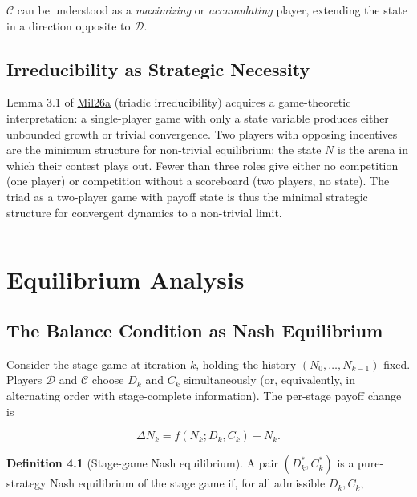 \documentclass[12pt]{article}
\begin{document}
\(\mathcal{C}\) can be understood as a \emph{maximizing} or
\emph{accumulating} player, extending the state in a direction opposite
to \(\mathcal{D}\).

\subsection{Irreducibility as Strategic Necessity}\label{irreducibility-as-strategic-necessity}

Lemma 3.1 of
\href{https://github.com/baardev/truevalue/blob/main/docnav/Research/papers/1_recursive-tholonic-five-constants/1_recursive-tholonic-five-constants.pdf}{Mil26a}
(triadic irreducibility) acquires a game-theoretic interpretation: a
single-player game with only a state variable produces either unbounded
growth or trivial convergence. Two players with opposing incentives are
the minimum structure for non-trivial equilibrium; the state \(N\) is
the arena in which their contest plays out. Fewer than three roles give
either no competition (one player) or competition without a scoreboard
(two players, no state). The triad as a two-player game with payoff
state is thus the minimal strategic structure for convergent dynamics to
a non-trivial limit.

\begin{center}\rule{0.5\linewidth}{0.5pt}\end{center}

\section{Equilibrium Analysis}\label{equilibrium-analysis}

\subsection{The Balance Condition as Nash Equilibrium}\label{the-balance-condition-as-nash-equilibrium}

Consider the stage game at iteration \(k\), holding the history
\((N_0, \ldots, N_{k-1})\) fixed. Players \(\mathcal{D}\) and
\(\mathcal{C}\) choose \(D_k\) and \(C_k\) simultaneously (or,
equivalently, in alternating order with stage-complete information). The
per-stage payoff change is

\[\Delta N_k = f(N_k; D_k, C_k) - N_k.\]

\textbf{Definition 4.1} (Stage-game Nash equilibrium). A pair
\((D_k^*, C_k^*)\) is a pure-strategy Nash equilibrium of the stage game
if, for all admissible \(D_k, C_k\),
\end{document}
